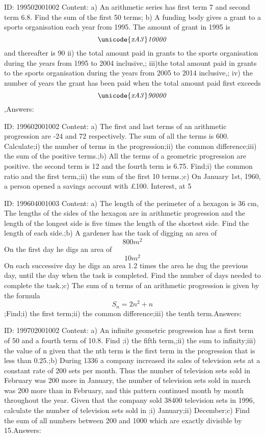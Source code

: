 \documentclass{article}
\begin{document}
ID: 199502001002
Content:
a) An arithmetic series has first term 7 and second term 6.8. Find the sum of the first 50 terms; b) A funding body gives a grant to a sports organisation each year from 1995. The amount of grant in 1995 is \[\it\unicode{xA3} 10000\] and thereafter is 90%
ii) the total amount paid in grants to the sports organisation during the years from 1995 to 2004 inclusive,;
iii)the total amount paid in grants to the sports organisation during the years from 2005 to 2014 inclusive,;
iv) the number of years the grant has been paid when the total amount paid first exceeds \[\it\unicode{xA3} 90000\],Answers:

ID: 199602001002
Content:
a) The first and last terms of an arithmetic progression are -24 and 72 respectively. The sum of all the terms is 600. Calculate;i) the number of terms in the progression;ii) the common difference;iii)	the sum of the positive terms.;b) All the terms of a geometric progression are positive. the second term is 12 and the fourth term is 6.75. Find;i) the common ratio and the first term,;ii) the sum of the first 10 terms.;c) On January 1st, 1960, a person opened a savings account with £100. Interest, at 5%

ID: 199604001003
Content:
a) The length of the perimeter of a hexagon is 36 cm, The lengths of the sides of the hexagon are in arithmetic progression and the length of the longest side is five times the length of the shortest side. Find the length of each side.;b) A gardener has the task of digging an area of \[800m^2\] On the first day he digs an area of \[10m^2\] On each successive day he digs an area 1.2 times the area he dug the previous day, until the day when the task is completed. Find the number of days needed to complete the task.;c) The sum of n terms of an arithmetic progression is given by the formula \[S_n=2n^2+n\];Find;i) the first term;ii) the common difference;iii) the tenth term.Answers:

ID: 199702001002
Content:
a) An infinite geometric progression has a first term of 50 and a fourth term of 10.8. Find ;i) the fifth term,;ii) the sum to infinity;iii) the value of n given that the nth term is the first term in the progression that is less than 0.25.;b) During 1336 a company increased its sales of television sets at a constant rate of 200 sets per month. Thus the number of television sets sold in February was 200 more in January, the number of television sets sold in march was 200 more than in February, and this pattern continued month by month throughout the year. Given that the company sold 38400 television sets in 1996, calculate the number of television sets sold in ;i) January;ii) December;c) Find the sum of all numbers between 200 and 1000 which are exactly divisible by 15.Answers:
\end{document}
